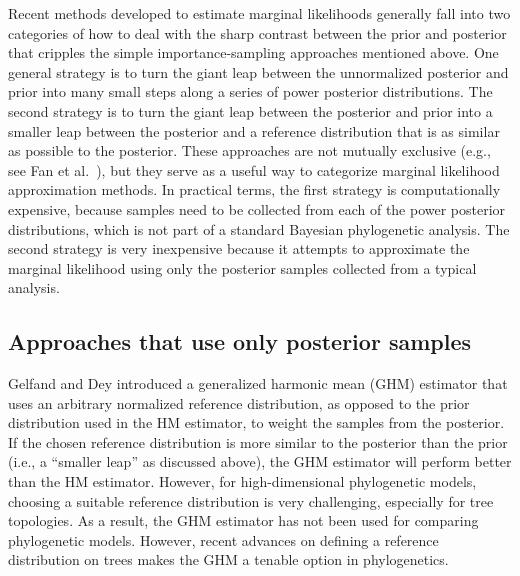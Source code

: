 Recent methods developed to estimate marginal likelihoods generally fall into
two categories of how to deal with the sharp contrast between the prior
and posterior that cripples the simple importance-sampling approaches
mentioned above.
One general strategy is to turn the giant leap between the unnormalized
posterior and prior into many small steps along a series of power posterior
distributions.
The second strategy is to turn the giant leap between the posterior and prior
into a smaller leap between the posterior and a reference distribution that is
as similar as possible to the posterior.
These approaches are not mutually exclusive (e.g., see Fan et al.\
\citeyear{Fan2011}), but they serve as a useful way to categorize marginal
likelihood approximation methods.
In practical terms, the first strategy is computationally expensive, because
samples need to be collected from each of the power posterior distributions,
which is not part of a standard Bayesian phylogenetic analysis.
The second strategy is very inexpensive because it attempts to approximate the
marginal likelihood using only the posterior samples collected from a
typical analysis.

\subsection{Approaches that use only posterior samples}

Gelfand and Dey \citeyear{Gelfand1994} introduced a generalized harmonic mean (GHM)
estimator that uses an arbitrary normalized reference distribution, as opposed
to the prior distribution used in the HM estimator, to weight the samples from
the posterior.
If the chosen reference distribution is more similar to the posterior than the
prior (i.e., a ``smaller leap'' as discussed above), the GHM estimator will
perform better than the HM estimator.
However, for high-dimensional phylogenetic models, choosing a suitable
reference distribution is very challenging, especially for tree topologies.
As a result, the GHM estimator has not been used for comparing phylogenetic
models.
However, recent advances on defining a reference distribution on trees
\citep{Holder2014} makes the GHM a tenable option in phylogenetics.


